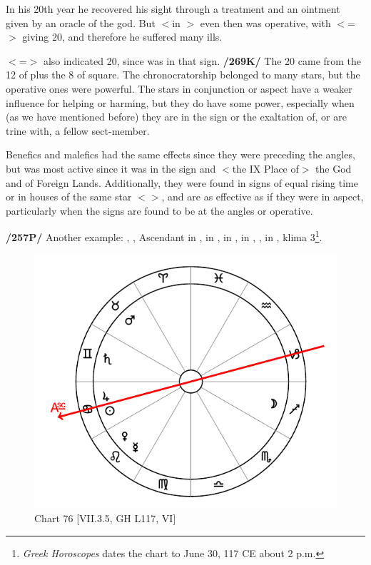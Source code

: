 In his 20th year he recovered his sight through a treatment and an ointment given by an oracle of the god. But \Saturn\xspace $<$in
\Gemini$>$ even then was operative, with \Gemini\xspace $<$=\Mercury$>$ giving 20, and therefore he suffered many ills.

\Virgo $<$=\Mercury$>$ also indicated 20, since \Jupiter was in that sign. \textbf{/269K/} The 20 came from the 12 of \Jupiter\xspace plus the 8 of \Venus\xspace square. The chronocratorship belonged to many stars, but the operative ones were powerful. The stars in conjunction or aspect have a weaker influence for helping or harming, but they do have some power, especially when (as we have mentioned before) they are in the sign or the exaltation of, or are trine with, a fellow sect-member. 

Benefics and malefics had the same effects since they were preceding the angles, but \Jupiter\xspace was most active since it was in the sign and $<$the IX Place of$>$ the God and of Foreign Lands. Additionally, they were found in signs of equal rising time or in houses of the same star $<$\Mercury$>$, and are as effective as if they were in aspect, particularly when the signs are found to be at
the angles or operative.

\textbf{/257P/} Another example: \Sun, \Jupiter, Ascendant in \Cancer, \Moon\xspace in \Sagittarius, \Saturn\xspace in \Gemini,
\Mars\xspace in \Taurus, \Venus, \Mercury\xspace in \Leo, klima 3\footnote{\textit{Greek Horoscopes} dates the chart to June 30, 117 CE about 2 p.m.}.

\begin{figure}
\centering
\vspace{-20pt}
\includegraphics[width=.68\textwidth]{charts/7_3_5}
\caption{Chart 76 [VII.3.5, GH L117, VI]}
\label{fig:chart76}
\end{figure} 

